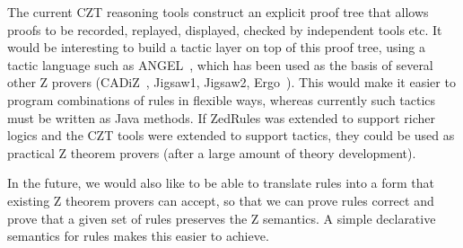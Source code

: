 \documentclass{entcs}
\begin{document}
The current CZT reasoning tools construct an explicit proof tree that
allows proofs to be recorded, replayed, displayed, checked by independent
tools etc.
It would be interesting to build a tactic layer on top of this proof
tree, using a tactic language such as ANGEL~\cite{martin:tactics}, which
has been used as the basis of several other Z provers
(CADiZ~\cite{Toyn98a}, Jigsaw1, Jigsaw2,
Ergo~\cite{martin:tac-lang-for-ergo}).
This would make it easier to program combinations of rules 
in flexible ways, whereas currently such tactics must be written as
Java methods.
If ZedRules was extended to support richer logics and the CZT tools were 
extended to support tactics, they could be used as practical Z theorem
provers (after a large amount of theory development).

In the future, we would also like to be able to translate rules
into a form that existing Z theorem provers can accept, so that we can prove
rules correct and prove that a given set of rules preserves the Z
semantics.  A simple declarative semantics for rules makes this
easier to achieve.



\end{document}
